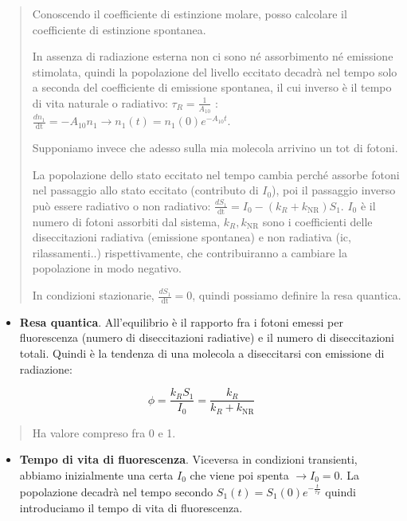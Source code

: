 \begin{quote}
Conoscendo il coefficiente di estinzione molare, posso calcolare il
coefficiente di estinzione spontanea.

In assenza di radiazione esterna non ci sono né assorbimento né
emissione stimolata, quindi la popolazione del livello eccitato decadrà
nel tempo solo a seconda del coefficiente di emissione spontanea, il cui
inverso è il tempo di vita naturale o radiativo:
\(\tau_{R} = \frac{1}{A_{10}}\) :
\(\frac{dn_{1}}{\text{dt}} = - A_{10}n_{1} \rightarrow n_{1}\left( t \right) = n_{1}\left( 0 \right)e^{- A_{10}t}\).

Supponiamo invece che adesso sulla mia molecola arrivino un tot di
fotoni.

La popolazione dello stato eccitato nel tempo cambia perché assorbe
fotoni nel passaggio allo stato eccitato (contributo di \(I_{0}\)), poi
il passaggio inverso può essere radiativo o non radiativo:
\(\frac{dS_{1}}{\text{dt}} = I_{0} - \left( k_{R} + k_{\text{NR}} \right)S_{1}\).
\(I_{0}\) è il numero di fotoni assorbiti dal sistema,
\(k_{R},k_{\text{NR}}\) sono i coefficienti delle diseccitazioni
radiativa (emissione spontanea) e non radiativa (ic, rilassamenti..)
rispettivamente, che contribuiranno a cambiare la popolazione in modo
negativo.

In condizioni stazionarie, \(\frac{dS_{1}}{\text{dt}} = 0\), quindi
possiamo definire la resa quantica.
\end{quote}

\begin{itemize}
\item
  \textbf{Resa quantica}. All'equilibrio è il rapporto fra i fotoni
  emessi per fluorescenza (numero di diseccitazioni radiative) e il
  numero di diseccitazioni totali. Quindi è la tendenza di una molecola
  a diseccitarsi con emissione di radiazione:
\end{itemize}

\[\phi = \frac{k_{R}S_{1}}{I_{0}} = \frac{k_{R}}{k_{R} + k_{\text{NR}}}\]

\begin{quote}
Ha valore compreso fra 0 e 1.
\end{quote}

\begin{itemize}
\item
  \textbf{Tempo di vita di fluorescenza}. Viceversa in condizioni
  transienti, abbiamo inizialmente una certa \(I_{0}\) che viene poi
  spenta \(\rightarrow I_{0} = 0\). La popolazione decadrà nel tempo
  secondo
  \(S_{1}\left( t \right) = S_{1}\left( 0 \right)e^{- \frac{t}{\tau_{F}}}\)
  quindi introduciamo il tempo di vita di fluorescenza.
\end{itemize}

